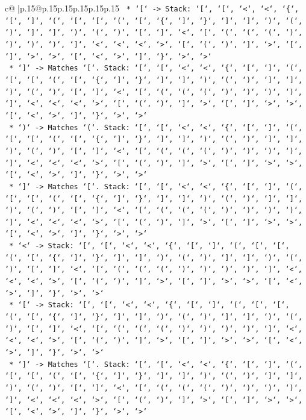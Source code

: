\documentclass{article}
\begin{document}
{\begin{supertabular}{c@{$\;$}|p{.15\linewidth}@{}p{.15\linewidth}p{.15\linewidth}p{.15\linewidth}p{.15\linewidth}p{.15\linewidth}}
{{{\texttt{    *   `{[}` {-}> Stack: `{[}`, `{[}`, `<`, `<`, `\{`, `{[}`, `{]}`, `(`, `{[}`, `{[}`, `(`, `{[}`, `\{`, `{]}`, `\}`, `{]}`, `{]}`, `)`, `(`, `)`, `{]}`, `{]}`, `)`, `(`, `)`, `{[}`, `{]}`, `<`, `{[}`, `(`, `(`, `(`, `)`, `)`, `)`, `)`, `{]}`, `<`, `<`, `<`, `>`, `{[}`, `(`, `)`, `{]}`, `>`, `{[}`, `{]}`, `>`, `>`, `{[}`, `<`, `>`, `{]}`, `\}`, `>`, `>`} \\
\texttt{    *   `{]}` {-}> Matches `{[}`. Stack: `{[}`, `{[}`, `<`, `<`, `\{`, `{[}`, `{]}`, `(`, `{[}`, `{[}`, `(`, `{[}`, `\{`, `{]}`, `\}`, `{]}`, `{]}`, `)`, `(`, `)`, `{]}`, `{]}`, `)`, `(`, `)`, `{[}`, `{]}`, `<`, `{[}`, `(`, `(`, `(`, `)`, `)`, `)`, `)`, `{]}`, `<`, `<`, `<`, `>`, `{[}`, `(`, `)`, `{]}`, `>`, `{[}`, `{]}`, `>`, `>`, `{[}`, `<`, `>`, `{]}`, `\}`, `>`, `>`} \\
\texttt{    *   `)` {-}> Matches `(`. Stack: `{[}`, `{[}`, `<`, `<`, `\{`, `{[}`, `{]}`, `(`, `{[}`, `{[}`, `(`, `{[}`, `\{`, `{]}`, `\}`, `{]}`, `{]}`, `)`, `(`, `)`, `{]}`, `{]}`, `)`, `(`, `)`, `{[}`, `{]}`, `<`, `{[}`, `(`, `(`, `(`, `)`, `)`, `)`, `)`, `{]}`, `<`, `<`, `<`, `>`, `{[}`, `(`, `)`, `{]}`, `>`, `{[}`, `{]}`, `>`, `>`, `{[}`, `<`, `>`, `{]}`, `\}`, `>`, `>`} \\
\texttt{    *   `{]}` {-}> Matches `{[}`. Stack: `{[}`, `{[}`, `<`, `<`, `\{`, `{[}`, `{]}`, `(`, `{[}`, `{[}`, `(`, `{[}`, `\{`, `{]}`, `\}`, `{]}`, `{]}`, `)`, `(`, `)`, `{]}`, `{]}`, `)`, `(`, `)`, `{[}`, `{]}`, `<`, `{[}`, `(`, `(`, `(`, `)`, `)`, `)`, `)`, `{]}`, `<`, `<`, `<`, `>`, `{[}`, `(`, `)`, `{]}`, `>`, `{[}`, `{]}`, `>`, `>`, `{[}`, `<`, `>`, `{]}`, `\}`, `>`, `>`} \\
\texttt{    *   `<` {-}> Stack: `{[}`, `{[}`, `<`, `<`, `\{`, `{[}`, `{]}`, `(`, `{[}`, `{[}`, `(`, `{[}`, `\{`, `{]}`, `\}`, `{]}`, `{]}`, `)`, `(`, `)`, `{]}`, `{]}`, `)`, `(`, `)`, `{[}`, `{]}`, `<`, `{[}`, `(`, `(`, `(`, `)`, `)`, `)`, `)`, `{]}`, `<`, `<`, `<`, `>`, `{[}`, `(`, `)`, `{]}`, `>`, `{[}`, `{]}`, `>`, `>`, `{[}`, `<`, `>`, `{]}`, `\}`, `>`, `>`} \\
\texttt{    *   `{[}` {-}> Stack: `{[}`, `{[}`, `<`, `<`, `\{`, `{[}`, `{]}`, `(`, `{[}`, `{[}`, `(`, `{[}`, `\{`, `{]}`, `\}`, `{]}`, `{]}`, `)`, `(`, `)`, `{]}`, `{]}`, `)`, `(`, `)`, `{[}`, `{]}`, `<`, `{[}`, `(`, `(`, `(`, `)`, `)`, `)`, `)`, `{]}`, `<`, `<`, `<`, `>`, `{[}`, `(`, `)`, `{]}`, `>`, `{[}`, `{]}`, `>`, `>`, `{[}`, `<`, `>`, `{]}`, `\}`, `>`, `>`} \\
\texttt{    *   `{]}` {-}> Matches `{[}`. Stack: `{[}`, `{[}`, `<`, `<`, `\{`, `{[}`, `{]}`, `(`, `{[}`, `{[}`, `(`, `{[}`, `\{`, `{]}`, `\}`, `{]}`, `{]}`, `)`, `(`, `)`, `{]}`, `{]}`, `)`, `(`, `)`, `{[}`, `{]}`, `<`, `{[}`, `(`, `(`, `(`, `)`, `)`, `)`, `)`, `{]}`, `<`, `<`, `<`, `>`, `{[}`, `(`, `)`, `{]}`, `>`, `{[}`, `{]}`, `>`, `>`, `{[}`, `<`, `>`, `{]}`, `\}`, `>`, `>`} \\
}}}
\end{supertabular}}
\end{document}
